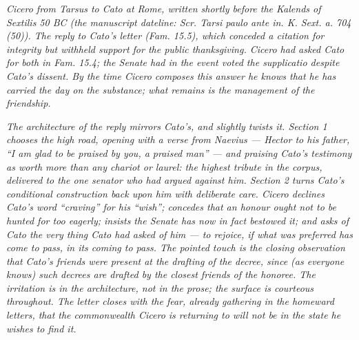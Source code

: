 
\textit{Cicero from Tarsus to Cato at Rome, written
shortly before the Kalends of Sextilis 50 BC (the
manuscript dateline: \textit{Scr. Tarsi paulo ante in.
K. Sext. a. 704 (50)}). The reply to Cato's letter
(Fam. 15.5), which conceded a citation for integrity but
withheld support for the public thanksgiving. Cicero had
asked Cato for both in Fam. 15.4; the Senate had in the
event voted the \textit{supplicatio} despite Cato's
dissent. By the time Cicero composes this answer he
knows that he has carried the day on the substance; what
remains is the management of the friendship.}

\textit{The architecture of the reply mirrors Cato's,
and slightly twists it. Section 1 chooses the high road,
opening with a verse from Naevius --- Hector to his
father, ``I am glad to be praised by you, a praised man''
--- and praising Cato's testimony as worth more than any
chariot or laurel: the highest tribute in the corpus,
delivered to the one senator who had argued against him.
Section 2 turns Cato's conditional construction back
upon him with deliberate care. Cicero declines Cato's
word ``craving'' for his ``wish''; concedes that an
honour ought not to be hunted for too eagerly; insists
the Senate has now in fact bestowed it; and asks of Cato
the very thing Cato had asked of him --- to rejoice, if
what was preferred has come to pass, in its coming to
pass. The pointed touch is the closing observation that
Cato's friends were present at the drafting of the
decree, since (as everyone knows) such decrees are
drafted by the closest friends of the honoree. The
irritation is in the architecture, not in the prose;
the surface is courteous throughout. The letter closes
with the fear, already gathering in the homeward
letters, that the commonwealth Cicero is returning to
will not be in the state he wishes to find it.}
